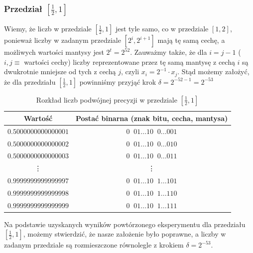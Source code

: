 \documentclass[12pt]{article}
\begin{document}
        \subsubsection*{Przedział $[\frac{1}{2}, 1]$}
            Wiemy, że liczb w przedziale $[\frac{1}{2}, 1]$ jest tyle samo, co w przedziale $[1, 2]$, ponieważ
            liczby w zadanym przedziale $[2^i, 2^{i + 1}]$ mają tę samą cechę, a możliwych wartości mantysy
            jest ${2^t = 2^{52}}$. Zauważmy także, że dla $i = j - 1$ ($i, j \equiv $ wartości cechy) liczby reprezentowane
            przez tę samą mantysę z cechą $i$ są dwukrotnie mniejsze od tych z cechą $j$, czyli $x_i = 2^{-1} \cdot x_j$. \newline
            Stąd możemy założyć, że dla przedziału $[\frac{1}{2}, 1]$ powinniśmy przyjąć krok $\delta = 2^{-52 - 1} = 2^{-53}$

            \begin{table}[h!]
                \centering
                \begin{tabularx}{0.74\textwidth}{c c}
                    \hline
                    Wartość & Postać binarna (znak bitu, cecha, mantysa) \\
                    \hline
                    $0.5000000000000001$ & $0\;\;01...10\;\;0...001$ \\
                    $0.5000000000000002$ & $0\;\;01...10\;\;0...010$ \\
                    $0.5000000000000003$ & $0\;\;01...10\;\;0...011$ \\
                    \vdots & \vdots \\
                    $0.9999999999999997$ & $0\;\;01...10\;\;1...101$ \\
                    $0.9999999999999998$ & $0\;\;01...10\;\;1...110$ \\
                    $0.9999999999999999$ & $0\;\;01...10\;\;1...111$ \\
                    \hline
                \end{tabularx}
                \caption{Rozkład liczb podwójnej precyzji w przedziale $[\frac{1}{2}, 1]$}
                \label{table:arrangement_in_05_1}
            \end{table}

            \noindent Na podstawie uzyskanych wyników powtórzonego eksperymentu dla przedziału $[\frac{1}{2}, 1]$,
            możemy stwierdzić, że nasze założenie było poprawne, a liczby w zadanym przedziale są rozmieszczone równolegle
            z krokiem $\delta = 2^{-53}$.
            \newline
\end{document}

